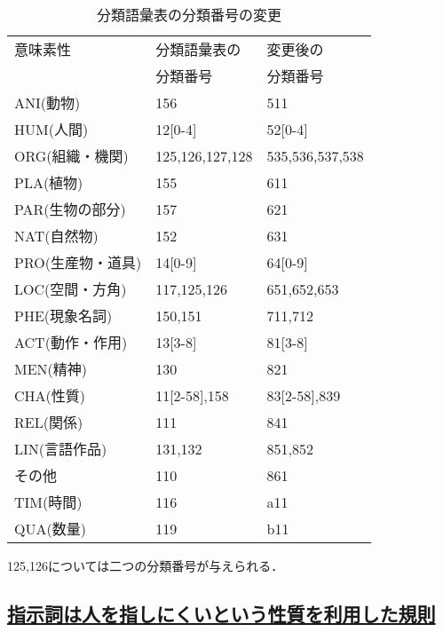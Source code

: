 \begin{table}[t]
    \caption{分類語彙表の分類番号の変更}
    \label{tab:bunrui_code_change}
  \begin{center}
\begin{tabular}[c]{|l|l|l|}\hline
意味素性          & 分類語彙表の        & 変更後の\\
                  &   分類番号            &        分類番号\\\hline
ANI(動物)         &  156                & 511\\[0cm]
HUM(人間)         &  12[0-4]            & 52[0-4]\\[0cm]
ORG(組織・機関)   &  125,126,127,128    & 535,536,537,538\\[0cm]
PLA(植物)         &  155                & 611\\[0cm]
PAR(生物の部分)   &  157                & 621\\[0cm]
NAT(自然物)       &  152                & 631\\[0cm]
PRO(生産物・道具) &  14[0-9]            & 64[0-9]\\[0cm]
LOC(空間・方角)   &  117,125,126        & 651,652,653\\[0cm]
PHE(現象名詞)     &  150,151            & 711,712\\[0cm]
ACT(動作・作用)   &  13[3-8]            & 81[3-8]\\[0cm]
MEN(精神)         &  130                & 821\\[0cm]
CHA(性質)         &  11[2-58],158       & 83[2-58],839\\[0cm]
REL(関係)         &  111                & 841\\[0cm]
LIN(言語作品)     &  131,132            & 851,852\\[0cm]
その他            &  110                & 861\\[0cm]
TIM(時間)         &  116                & a11\\[0cm]
QUA(数量)         &  119                & b11\\[0cm]\hline
\end{tabular}

125,126については二つの分類番号が与えられる．
\end{center}
\end{table}

\subsection*{\underline{指示詞は人を指しにくいという性質を利用した規則}}



